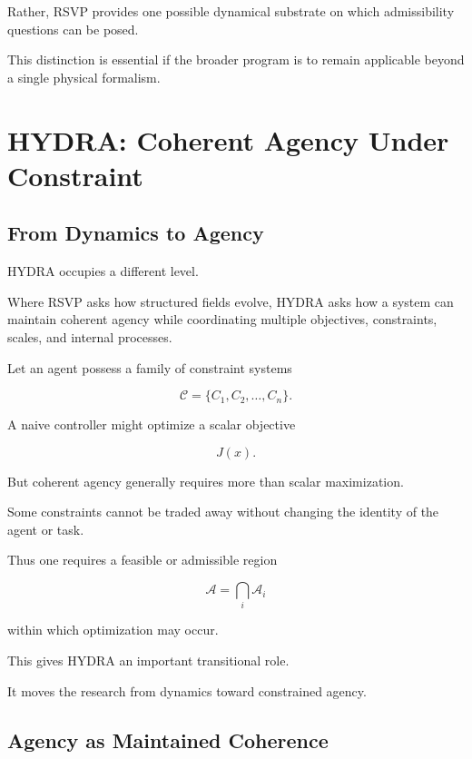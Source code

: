 \documentclass[11pt]{article}
\theoremstyle{remark}
\newcommand{\RSVP}{\textsc{RSVP}}
\newcommand{\HYDRA}{\textsc{HYDRA}}
\begin{document}
Rather, \RSVP{} provides one possible dynamical substrate on which admissibility questions can be posed.

This distinction is essential if the broader program is to remain applicable beyond a single physical formalism.

\section{\HYDRA{}: Coherent Agency Under Constraint}

\subsection{From Dynamics to Agency}

\HYDRA{} occupies a different level.

Where \RSVP{} asks how structured fields evolve, \HYDRA{} asks how a system can maintain coherent agency while coordinating multiple objectives, constraints, scales, and internal processes.

Let an agent possess a family of constraint systems

\begin{equation}
\mathcal{C}
=
\{
C_1,C_2,\ldots,C_n
\}.
\end{equation}

A naive controller might optimize a scalar objective

\begin{equation}
J(x).
\end{equation}

But coherent agency generally requires more than scalar maximization.

Some constraints cannot be traded away without changing the identity of the agent or task.

Thus one requires a feasible or admissible region

\begin{equation}
\mathcal{A}
=
\bigcap_i \mathcal{A}_i
\end{equation}

within which optimization may occur.

This gives \HYDRA{} an important transitional role.

It moves the research from dynamics toward constrained agency.

\subsection{Agency as Maintained Coherence}
\end{document}
